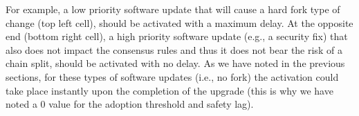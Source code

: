For example, a low priority software update that will cause a hard fork type of change (top left cell), should be activated with a maximum delay. At the opposite end (bottom right cell), a high priority software update (e.g., a security fix) that also does not impact the consensus rules and thus it does not bear the risk of a chain split, should be activated with no delay. As we have noted in the previous sections, for these types of software updates (i.e., no fork) the activation could take place instantly upon the completion of the upgrade (this is why we have noted a $0$ value for the adoption threshold and safety lag).

 


